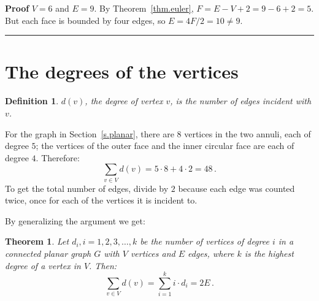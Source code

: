 \documentclass[11pt,a4paper]{article}
\newtheorem{theorem}{Theorem}
\newtheorem{definition}{Definition}
\newcommand*{\qed}{\hfill\rule{1ex}{1.5ex}}
\begin{document}
\begin{center}
\end{center}
\textbf{Proof}
$V=6$ and $E=9$. By Theorem~\ref{thm.euler}, $F=E-V+2=9-6+2=5$. But each face is bounded by four edges, so $E=4F/2=10\neq 9$.\qed

\section{The degrees of the vertices}

\begin{definition}
$d(v)$, the degree of vertex $v$, is the number of edges incident with $v$.
\end{definition}
For the graph in Section~\ref{s.planar}, there are $8$ vertices in the two annuli, each of degree $5$; the vertices of the outer face and the inner circular face are each of degree $4$. Therefore:
\[
\sum_{v\in V} d(v) = 5\cdot 8 + 4\cdot 2=48\,.
\]
To get the total number of edges, divide by $2$ because  each edge was counted twice, once for each of the vertices it is incident to.

By generalizing the argument we get:
\begin{theorem}\label{thm.degrees}
Let $d_i, i=1,2,3,\ldots,k$ be the number of vertices of degree $i$ in a connected planar graph $G$ with $V$ vertices and $E$ edges, where $k$ is the highest degree of a vertex in $V$. Then:
\[
\sum_{v\in V} d(v) =\sum_{i=1}^{k} i\cdot d_i=2E\,.
\]
\end{theorem}
\end{document}
